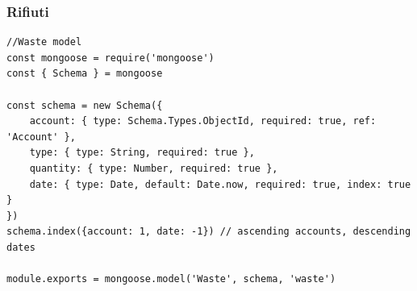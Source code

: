 \documentclass{report}
\begin{document}
\subsubsection{Rifiuti}
\begin{lstlisting}
//Waste model
const mongoose = require('mongoose')
const { Schema } = mongoose

const schema = new Schema({
    account: { type: Schema.Types.ObjectId, required: true, ref: 'Account' },
    type: { type: String, required: true },
    quantity: { type: Number, required: true },
    date: { type: Date, default: Date.now, required: true, index: true }
})
schema.index({account: 1, date: -1}) // ascending accounts, descending dates

module.exports = mongoose.model('Waste', schema, 'waste')
\end{lstlisting}
\end{document}
